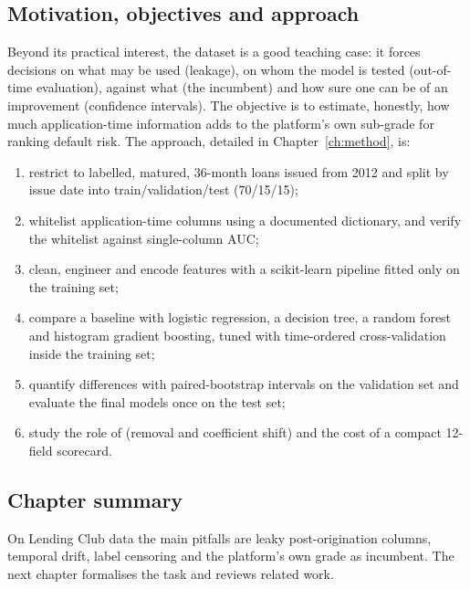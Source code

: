 \subsection{Motivation, objectives and approach}

Beyond its practical interest, the dataset is a good teaching case: it forces decisions on what may be used (leakage), on whom the model is tested (out-of-time evaluation), against what (the incumbent) and how sure one can be of an improvement (confidence intervals). The objective is to estimate, honestly, how much application-time information adds to the platform's own sub-grade for ranking default risk. The approach, detailed in Chapter~\ref{ch:method}, is:

\begin{enumerate}
    \item restrict to labelled, matured, 36-month loans issued from 2012 and split by issue date into train/validation/test (70/15/15);
    \item whitelist application-time columns using a documented dictionary, and verify the whitelist against single-column AUC;
    \item clean, engineer and encode features with a scikit-learn pipeline fitted only on the training set;
    \item compare a  baseline with logistic regression, a decision tree, a random forest and histogram gradient boosting, tuned with time-ordered cross-validation inside the training set;
    \item quantify differences with paired-bootstrap intervals on the validation set and evaluate the final models once on the test set;
    \item study the role of  (removal and coefficient shift) and the cost of a compact 12-field scorecard.
\end{enumerate}

\subsection{Chapter summary}

On Lending Club data the main pitfalls are leaky post-origination columns, temporal drift, label censoring and the platform's own grade as incumbent. The next chapter formalises the task and reviews related work.
